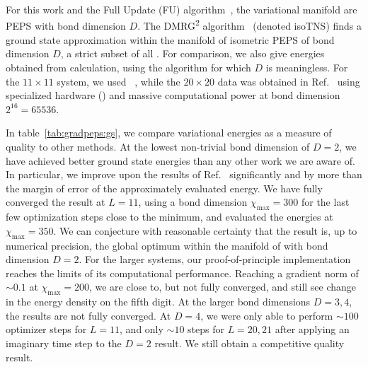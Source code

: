 \begin{table}[htp]
{        For this work and the Full Update (FU) algorithm\ \cite{lubasch2014a}, the variational manifold are PEPS with bond dimension $D$.
        The DMRG\textsuperscript{2} algorithm\ \cite{lin2022} (denoted isoTNS) finds a ground state approximation within
        the manifold of isometric PEPS of bond dimension $D$, a strict subset of all .
        For comparison, we also give energies obtained from  calculation, using the  algorithm for which $D$ is meaningless.
        For the $11\times 11$ system, we used ~\cite{tenpySoftware, hauschild2024}, while the $20\times 20$ data was obtained in Ref.\ \cite{ganahl2023} using specialized hardware () and massive computational power at  bond dimension $2^{16} = 65536$.
    }
\end{table}




In table~\ref{tab:gradpeps:gs}, we compare variational energies as a measure of quality to other  methods.
%
At the lowest non-trivial bond dimension of $D=2$, we have achieved better ground state energies than any other  work we are aware of.
%
In particular, we improve upon the  results of Ref.~\cite{lubasch2014a} significantly and by more than the margin of error of the approximately evaluated energy.
%
We have fully converged the result at $L=11$, using a  bond dimension $\chi_\text{max} = 300$ for the last few optimization steps close to the minimum, and evaluated the energies at $\chi_\text{max} = 350$.
%
We can conjecture with reasonable certainty that the result is, up to numerical precision, the global optimum within the manifold of  with bond dimension $D=2$.
%
For the larger systems, our proof-of-principle implementation reaches the limits of its computational performance.
%
Reaching a gradient norm of $\sim 0.1$ at $\chi_\text{max} = 200$, we are close to, but not fully converged, and still see change in the energy density on the fifth digit.
%
At the larger bond dimensions $D=3,4$, the results are not fully converged.
%
At $D=4$, we were only able to perform $\sim 100$ optimizer steps for $L=11$, and only $\sim 10$ steps for $L=20,21$ after applying an imaginary time step to the $D=2$ result.
%
We still obtain a competitive quality result.


